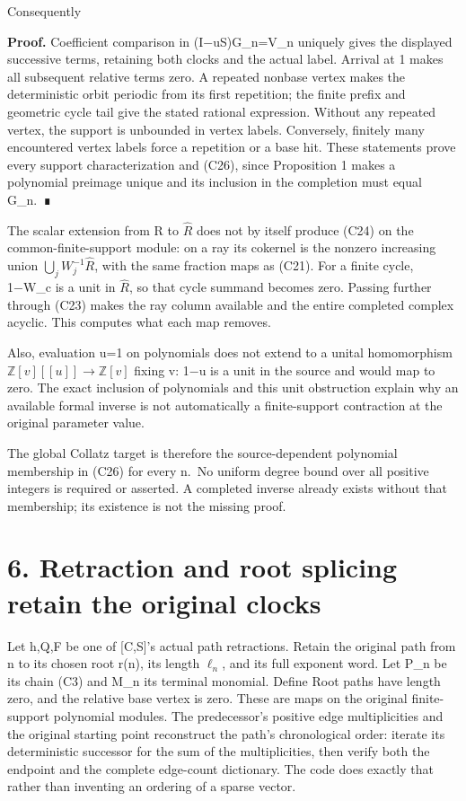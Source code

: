 Consequently 

\textbf{Proof.} Coefficient comparison in (I−uS)G\_n=V\_n uniquely gives
the displayed successive terms, retaining both clocks and the actual
label. Arrival at 1 makes all subsequent relative terms zero. A repeated
nonbase vertex makes the deterministic orbit periodic from its first
repetition; the finite prefix and geometric cycle tail give the stated
rational expression. Without any repeated vertex, the support is
unbounded in vertex labels. Conversely, finitely many encountered vertex
labels force a repetition or a base hit. These statements prove every
support characterization and (C26), since Proposition 1 makes a
polynomial preimage unique and its inclusion in the completion must
equal G\_n.~∎

The scalar extension from R to \(\widehat R\) does not by itself produce
(C24) on the common-finite-support module: on a ray its cokernel is the
nonzero increasing union \(\bigcup_j W_j^{-1}\widehat R\), with the same
fraction maps as (C21). For a finite cycle, 1−W\_c is a unit in
\(\widehat R\), so that cycle summand becomes zero. Passing further
through (C23) makes the ray column available and the entire completed
complex acyclic. This computes what each map removes.

Also, evaluation u=1 on polynomials does not extend to a unital
homomorphism \(\mathbb Z[v][[u]]\to\mathbb Z[v]\) fixing v: 1−u is a
unit in the source and would map to zero. The exact inclusion of
polynomials and this unit obstruction explain why an available formal
inverse is not automatically a finite-support contraction at the
original parameter value.

The global Collatz target is therefore the source-dependent polynomial
membership in (C26) for every n.~No uniform degree bound over all
positive integers is required or asserted. A completed inverse already
exists without that membership; its existence is not the missing proof.

\section{6. Retraction and root splicing retain the original clocks}

Let h,Q,F be one of {[}C,S{]}'s actual path retractions. Retain the
original path from n to its chosen root r(n), its length \(\ell_n\), and
its full exponent word. Let P\_n be its chain (C3) and M\_n its terminal
monomial. Define
 Root paths have length zero, and the relative base
vertex is zero. These are maps on the original finite-support polynomial
modules. The predecessor's positive edge multiplicities and the original
starting point reconstruct the path's chronological order: iterate its
deterministic successor for the sum of the multiplicities, then verify
both the endpoint and the complete edge-count dictionary. The code does
exactly that rather than inventing an ordering of a sparse vector.

